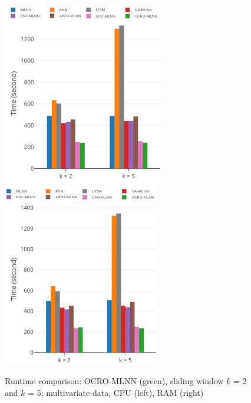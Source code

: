 \documentclass[11pt,twoside]{article}
\begin{document}
\begin{multicols}{2}
\begin{figure}[!t]
	\centering
	\begin{minipage}[t]{1.0\textwidth}
		\centering
		\includegraphics[width=0.45\textwidth =0cm 0cm 0cm 0cm, height = 8cm]{images/pdf/time/time_cpu.pdf}
		\centering
		\includegraphics[width=0.45\textwidth =0cm 0cm 0cm 0cm, height = 8cm]{images/pdf/time/time_ram.pdf}
	\end{minipage}
	\caption{Runtime comparison: OCRO-MLNN (green), sliding window $k$ = 2 and $k$ = 5; multivariate data, CPU (left), RAM (right)} 
	\label{fig:speed_system_multivariate}
\end{figure}


\end{multicols}
\end{document}
